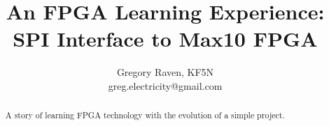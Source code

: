 \documentclass[letterpaper,12pt]{article}
\title{An FPGA Learning Experience:  SPI Interface to Max10 FPGA}
\author{Gregory Raven, KF5N \\ greg.electricity@gmail.com}
\begin{document}
	
		\maketitle
	
	\begin{abstract}
		A story of learning FPGA technology with the evolution of a simple project.
	\end{abstract}







\end{document}
